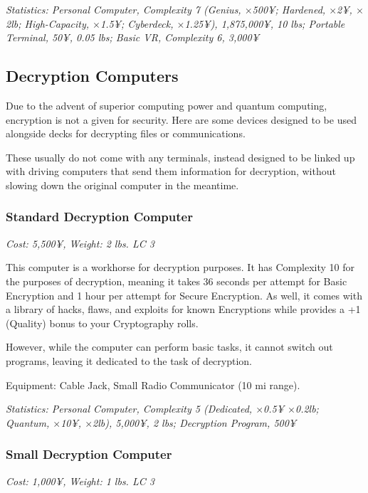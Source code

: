 \begin{multicols}{3}
	\textit{\textcolor{OliveGreen}{Statistics: Personal Computer, Complexity 7 (Genius, \(\times\)500¥; Hardened, \(\times\)2¥, \(\times\)2lb; High-Capacity, \(\times\)1.5¥; Cyberdeck, \(\times\)1.25¥), 1,875,000¥, 10 lbs; Portable Terminal, 50¥, 0.05 lbs; Basic VR, Complexity 6, 3,000¥}}
	
	\subsection{Decryption Computers}
	
	Due to the advent of superior computing power and quantum computing, encryption is not a given for security. Here are some devices designed to be used alongside decks for decrypting files or communications.
	
	These usually do not come with any terminals, instead designed to be linked up with driving computers that send them information for decryption, without slowing down the original computer in the meantime.
	
	\subsubsection*{Standard Decryption Computer}
	
	\textit{\textcolor{NavyBlue}{Cost: 5,500¥, Weight: 2 lbs. LC 3}}
	
	This computer is a workhorse for decryption purposes. It has Complexity 10 for the purposes of decryption, meaning it takes 36 seconds per attempt for Basic Encryption and 1 hour per attempt for Secure Encryption. As well, it comes with a library of hacks, flaws, and exploits for known Encryptions while provides a +1 (Quality) bonus to your Cryptography rolls.
	
	However, while the computer can perform basic tasks, it cannot switch out programs, leaving it dedicated to the task of decryption.
	
	Equipment: Cable Jack, Small Radio Communicator (10 mi range).
	
	\textit{\textcolor{OliveGreen}{Statistics: Personal Computer, Complexity 5 (Dedicated, \(\times\)0.5¥ \(\times\)0.2lb; Quantum, \(\times\)10¥, \(\times\)2lb), 5,000¥, 2 lbs; Decryption Program, 500¥}}
	
	\subsubsection*{Small Decryption Computer}
	
	\textit{\textcolor{NavyBlue}{Cost: 1,000¥, Weight: 1 lbs. LC 3}}
	

\end{multicols}
